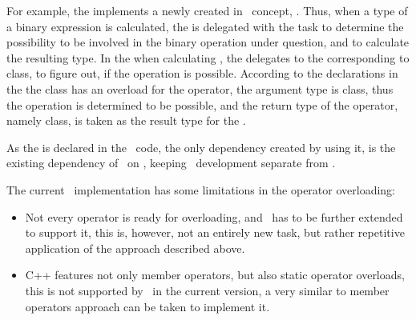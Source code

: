For example, the  implements a newly created in \mbdr\ concept, 
 . Thus, when a type of a 
binary expression is calculated, the  is delegated with the task to 
determine the possibility to be involved in the binary operation under question, 
and to calculate the resulting type.
In the  when calculating , the 
 delegates to the  corresponding to  
class, to figure out, if the operation is possible. According to the declarations in the
 the  class has an overload for the \cc{+} operator,
the argument type is  class, thus the operation is determined to be possible,
and the return type of the operator, namely  class, is taken as the result
type for the .

As the   is declared in
the \mbdp\ code, the only dependency created by using it, is the existing dependency of \pcpp\
on \mbdr, keeping \mbdr\ development separate from \pcpp.

The current \pcpp\ implementation has some limitations in the operator overloading:
\begin{itemize}
 \item Not every operator is ready for overloading, and \mbdr\ has to be further extended 
 to support it, this is, however, not an entirely new task, but rather repetitive application
 of the approach described above.
 \item C++ features not only member operators, but also static operator overloads, this is 
 not supported by \pcpp\ in the current version, a very similar to member operators approach can be 
 taken to implement it.
\end{itemize}
